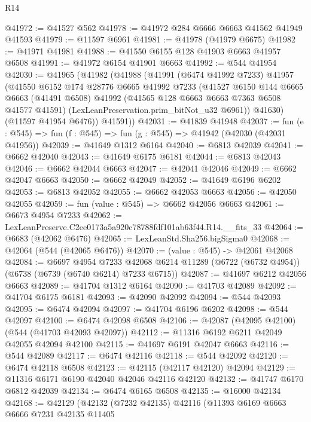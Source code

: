 \begin{lexlean}{R14}
\begin{coremodule}
@41972 := @41527 @562
@41978 := @41972 @284 @6666 @6663 @41562 @41949 @41593
@41979 := @11597 @6961
@41981 := @41978 (@41979 @6675)
@41982 := @41971 @41981
@41988 := @41550 @6155 @128 @41903 @6663 @41957 @6508
@41991 := @41972 @6154 @41901 @6663
@41992 := @544 @41954
@42030 := @41965
    (@41982
      (@41988
        (@41991
          (@6474 @41992 @7233)
          @41957
          (@41550
            @6152
            @174
            @28776
            @6665
            @41992
            @7233
            (@41527
              @6150
              @144
              @6665
              @6663
              (@41491 @6508)
              @41992
              (@41565 @128 @6663 @6663 @7363 @6508 @41577 @41591)
              (LexLeanPreservation.prim_bitNot_u32 @6961))
            @41630)
          (@11597 @41954 @6476))
        @41591))
@42031 := @41839 @41948
@42037 := fun (e : @545) => fun (f : @545) => fun (g : @545) => @41942 (@42030 (@42031 @41956))
@42039 := @41649 @1312 @6164
@42040 := @6813 @42039
@42041 := @6662 @42040
@42043 := @41649 @6175 @6181
@42044 := @6813 @42043
@42046 := @6662 @42044 @6663
@42047 := @42041 @42046
@42049 := @6662 @42047 @6663
@42050 := @6662 @42049
@42052 := @41649 @6196 @6202
@42053 := @6813 @42052
@42055 := @6662 @42053 @6663
@42056 := @42050 @42055
@42059 := fun (value : @545) => @6662 @42056 @6663
@42061 := @6673 @4954 @7233
@42062 := LexLeanPreserve.C2ee0173a5a920c78788fdf101ab63f44.R14.__fits_33
@42064 := @6683 (@42062 @6476)
@42065 := LexLeanStd.Sha256.bigSigma0
@42068 := @42064 (@544 (@42065 @6476))
@42070 := (value : @545) -> @42061 @42068
@42084 := @6697
    @4954
    @7233
    @42068
    @6214
    @11289
    (@6722 (@6732 @4954))
    (@6738 (@6739 (@6740 @6214) @7233 @6715))
@42087 := @41697 @6212 @42056 @6663
@42089 := @41704 @1312 @6164
@42090 := @41703 @42089
@42092 := @41704 @6175 @6181
@42093 := @42090 @42092
@42094 := @544 @42093
@42095 := @6474 @42094
@42097 := @41704 @6196 @6202
@42098 := @544 @42097
@42100 := @6474 @42098 @6508
@42106 := @42087 (@42095 @42100) (@544 (@41703 @42093 @42097))
@42112 := @11316 @6192 @6211 @42049 @42055 @42094 @42100
@42115 := @41697 @6191 @42047 @6663
@42116 := @544 @42089
@42117 := @6474 @42116
@42118 := @544 @42092
@42120 := @6474 @42118 @6508
@42123 := @42115 (@42117 @42120) @42094
@42129 := @11316 @6171 @6190 @42040 @42046 @42116 @42120
@42132 := @41747 @6170 @6812 @42039
@42134 := @6474 @6165 @6508
@42135 := @16000 @42134
@42168 := @42129
    (@42132
      (@7232 @42135)
      @42116
      (@11393
        @6169
        @6663
        @6666
        @7231
        @42135
        @11405

\end{coremodule}
\end{lexlean}
